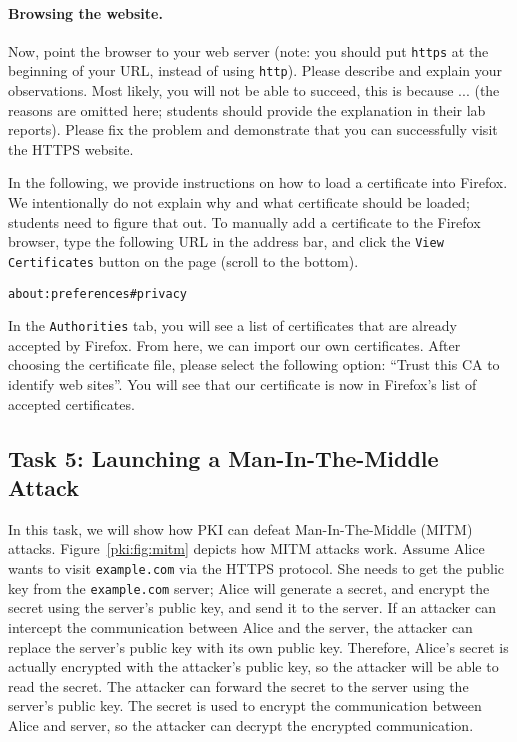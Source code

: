 \paragraph{Browsing the website.} 
Now, point the browser to your web server (note: you should 
put \texttt{https} at the beginning of your URL, instead of using \texttt{http}).  
Please describe and explain your observations. 
Most likely, you will not be able to succeed,  this is
because ... (the reasons are omitted here; students should 
provide the explanation in their lab reports). Please fix the problem
and demonstrate that you can successfully visit the HTTPS website. 


In the following, we provide instructions on how to load 
a certificate into Firefox. We intentionally do not explain why and what 
certificate should be loaded; students need to figure that out.
To manually add a certificate to the Firefox browser,  type the following
URL in the address bar, and click the \texttt{View Certificates} button 
on the page (scroll to the bottom).

\begin{lstlisting}
about:preferences#privacy
\end{lstlisting}

In the \texttt{Authorities} tab,  you will see a list of certificates 
that are already accepted by Firefox. From here, we 
can import our own certificates. After choosing the certificate 
file, please select the following option: ``Trust this CA to identify web sites''.  
You will see that our certificate is now in Firefox's list of 
accepted certificates. 



\subsection{Task 5: Launching a Man-In-The-Middle Attack}

In this task, we will show how PKI can defeat Man-In-The-Middle (MITM) attacks. 
Figure~\ref{pki:fig:mitm} depicts how MITM attacks work. 
Assume Alice wants to visit \texttt{example.com} via the HTTPS protocol. She 
needs to get the public key from the \texttt{example.com} server; Alice will 
generate a secret, and encrypt the secret using the server's public key,
and send it to the server. 
If an attacker can
intercept the communication between Alice and the server, the attacker 
can replace the server's public key with its own public key. Therefore, Alice's secret is
actually encrypted with the attacker's public key, so the attacker
will be able to read the secret. The attacker can forward the secret to the server using the
server's public key. The secret is used to encrypt the communication between Alice and server,  
so the attacker can decrypt the encrypted communication. 


